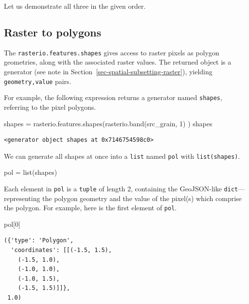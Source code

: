 \documentclass[
  letterpaper,
]{krantz}
\newenvironment{Shaded}{\begin{snugshade}}{\end{snugshade}}
\newcommand{\BuiltInTok}[1]{\textcolor[rgb]{0.00,0.23,0.31}{#1}}
\newcommand{\DecValTok}[1]{\textcolor[rgb]{0.68,0.00,0.00}{#1}}
\newcommand{\NormalTok}[1]{\textcolor[rgb]{0.00,0.23,0.31}{#1}}
\newcommand{\OperatorTok}[1]{\textcolor[rgb]{0.37,0.37,0.37}{#1}}
\begin{document}
Let us demonstrate all three in the given order.

\subsection{Raster to polygons}\label{sec-raster-to-polygons}

The \texttt{rasterio.features.shapes} gives access to raster pixels as
polygon geometries, along with the associated raster values. The
returned object is a generator (see note in
Section~\ref{sec-spatial-subsetting-raster}), yielding
\texttt{geometry,value} pairs.

For example, the following expression returns a generator named
\texttt{shapes}, referring to the pixel polygons.

\begin{Shaded}
\begin{Highlighting}[]
\NormalTok{shapes }\OperatorTok{=}\NormalTok{ rasterio.features.shapes(rasterio.band(src\_grain, }\DecValTok{1}\NormalTok{) )}
\NormalTok{shapes}
\end{Highlighting}
\end{Shaded}

\begin{verbatim}
<generator object shapes at 0x7146754598c0>
\end{verbatim}

We can generate all shapes at once into a \texttt{list} named
\texttt{pol} with \texttt{list(shapes)}.

\begin{Shaded}
\begin{Highlighting}[]
\NormalTok{pol }\OperatorTok{=} \BuiltInTok{list}\NormalTok{(shapes)}
\end{Highlighting}
\end{Shaded}

Each element in \texttt{pol} is a \texttt{tuple} of length 2, containing
the GeoJSON-like \texttt{dict}---representing the polygon geometry and
the value of the pixel(s) which comprise the polygon. For example, here
is the first element of \texttt{pol}.

\begin{Shaded}
\begin{Highlighting}[]
\NormalTok{pol[}\DecValTok{0}\NormalTok{]}
\end{Highlighting}
\end{Shaded}

\begin{verbatim}
({'type': 'Polygon',
  'coordinates': [[(-1.5, 1.5),
    (-1.5, 1.0),
    (-1.0, 1.0),
    (-1.0, 1.5),
    (-1.5, 1.5)]]},
 1.0)
\end{verbatim}
\end{document}
